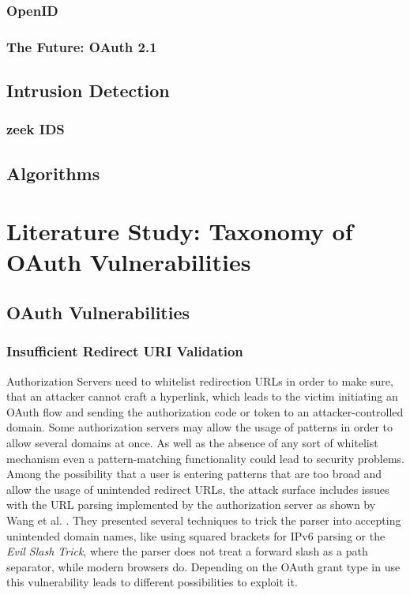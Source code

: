 \documentclass[
    fontsize=12pt,
    headings=small,
    parskip=half,           %
    bibliography=totoc,
    numbers=noenddot,       %
    open=any,               %
    ]{scrreprt}
\begin{document}
\subsection{OpenID}

\subsection{The Future: OAuth 2.1}

\section{Intrusion Detection}

\subsection{zeek IDS}

\section{Algorithms}

\chapter{Literature Study: Taxonomy of OAuth Vulnerabilities}
\section{OAuth Vulnerabilities}

\subsection{Insufficient Redirect URI Validation \cite{lodderstedt2020oauth} \cite{wang2019make}}
Authorization Servers need to whitelist redirection URLs in order to make sure,
that an attacker cannot craft a hyperlink, which leads to the victim initiating
an OAuth flow and sending the authorization code or token to an
attacker-controlled domain. Some authorization servers may allow the usage of
patterns in order to allow several domains at once. As well as the absence of
any sort of whitelist mechanism even a pattern-matching functionality could
lead to security problems. Among the possibility that a user is entering
patterns that are too broad and allow the usage of unintended redirect URLs,
the attack surface includes issues with the URL parsing implemented by the
authorization server as shown by Wang et al. \cite{wang2019make}. They
presented several techniques to trick the parser into accepting unintended
domain names, like using squared brackets for IPv6 parsing or the \emph{Evil
Slash Trick}, where the parser does not treat a forward slash as a path
separator, while modern browsers do. Depending on the OAuth grant type in use
this vulnerability leads to different possibilities to exploit it.
\end{document}
